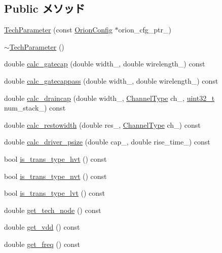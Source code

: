 \subsection*{Public メソッド}
\begin{DoxyCompactItemize}
\item 
\hyperlink{classTechParameter_a2ffd46eddf786e3de753d29604516edb}{TechParameter} (const \hyperlink{classOrionConfig}{OrionConfig} $\ast$orion\_\-cfg\_\-ptr\_\-)
\item 
\hyperlink{classTechParameter_aa7c01789876ebc190e4efe412bfb3435}{$\sim$TechParameter} ()
\item 
double \hyperlink{classTechParameter_a4011376f02f1fd5a8d32797893389f68}{calc\_\-gatecap} (double width\_\-, double wirelength\_\-) const 
\item 
double \hyperlink{classTechParameter_a581268b9e7f5d1345f4bf9b3c3d97ce7}{calc\_\-gatecappass} (double width\_\-, double wirelength\_\-) const 
\item 
double \hyperlink{classTechParameter_ad0fce6ad14f629d961ca0b6f2a9abe39}{calc\_\-draincap} (double width\_\-, \hyperlink{classTechParameter_a19a96edeeb9d37072c4ce9f862d19ba8}{ChannelType} ch\_\-, \hyperlink{Type_8hh_a435d1572bf3f880d55459d9805097f62}{uint32\_\-t} num\_\-stack\_\-) const 
\item 
double \hyperlink{classTechParameter_aa0e13430521f01f76cd850c20a163683}{calc\_\-restowidth} (double res\_\-, \hyperlink{classTechParameter_a19a96edeeb9d37072c4ce9f862d19ba8}{ChannelType} ch\_\-) const 
\item 
double \hyperlink{classTechParameter_aa9f767e191585de42f46eb4cf54a31c8}{calc\_\-driver\_\-psize} (double cap\_\-, double rise\_\-time\_\-) const 
\item 
bool \hyperlink{classTechParameter_a1ccfa8e2ac81e37dc4957433a0ecaa13}{is\_\-trans\_\-type\_\-hvt} () const 
\item 
bool \hyperlink{classTechParameter_aaf5b98ffedfd4397b1235cc89878c25d}{is\_\-trans\_\-type\_\-nvt} () const 
\item 
bool \hyperlink{classTechParameter_ab3a77ca69c4b98307e87a6b8d12cba60}{is\_\-trans\_\-type\_\-lvt} () const 
\item 
double \hyperlink{classTechParameter_a4f7f80eca67058bf81ffce3a3c9371f5}{get\_\-tech\_\-node} () const 
\item 
double \hyperlink{classTechParameter_a7e62d136a4e89f12981ce9fedac950f8}{get\_\-vdd} () const 
\item 
double \hyperlink{classTechParameter_aae98aa6884a276624d3ddd015f5a1825}{get\_\-freq} () const 

\end{DoxyCompactItemize}
